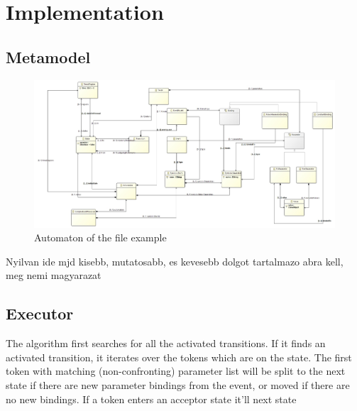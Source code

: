 	\section{Implementation}
		\subsection{Metamodel}
		
			\begin{figure}[h]
			\centering
			\includegraphics[width=0.9\linewidth]{include/figures/chapter_5/model}
			\caption{Automaton of the file example}
			\label{fig:cep:model}
			\end{figure}
		Nyilvan ide mjd kisebb, mutatosabb, es kevesebb dolgot tartalmazo abra kell, meg nemi magyarazat
		\subsection{Executor}
			The algorithm first searches for all the activated transitions.
			If it finds an activated transition, it iterates over the tokens which are on the state. The first token with matching (non-confronting)
			parameter list will be split to the next state if there are new parameter bindings from the event, or moved if there are no new bindings.
			If a token enters an acceptor state it'll 
			next state 